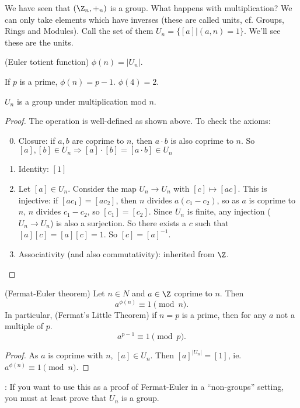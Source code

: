 \documentclass[a4paper]{article}
\begin{document}
  We have seen that $(\Z_n, +_n)$ is a group. What happens with multiplication? We can only take elements which have inverses (these are called units, cf. Groups, Rings and Modules). Call the set of them $U_n = \{[a] | (a, n) = 1\}$. We'll see these are the units.
  \begin{defi}
    (Euler totient function) $\phi (n) = |U_n|$.
  \end{defi}

  \begin{eg}
    If $p$ is a prime, $\phi(n) = p - 1$. $\phi(4) = 2$.
  \end{eg}

  \begin{prop}
    $U_n$ is a group under multiplication mod $n$.
  \end{prop}

  \begin{proof}
    The operation is well-defined as shown above. To check the axioms:
    \begin{enumerate}[label=\arabic{*}.]
        \setcounter{enumi}{-1}
      \item Closure: if $a, b$ are coprime to $n$, then $a\cdot b$ is also coprime to $n$. So $[a], [b]\in U_n \Rightarrow [a]\cdot [b] = [a\cdot b]\in U_n$
      \item Identity: $[1]$
      \item Let $[a]\in U_n$. Consider the map $U_n \to U_n$ with $[c]\mapsto [ac]$. This is injective: if $[ac_1] = [ac_2]$, then $n $ divides $a(c_1 - c_2)$, so as $a$ is coprime to $n$, $n$ divides $c_1 - c_2$, so $[c_1] = [c_2]$. Since $U_n$ is finite, any injection ($U_n \to U_n$) is also a surjection. So there exists a $c$ such that $[a][c] = [a][c] = 1$. So $[c] = [a]^{-1}$.
      \item Associativity (and also commutativity): inherited from $\Z$.
    \end{enumerate}
  \end{proof}
  \begin{thm}
    (Fermat-Euler theorem) Let $n\in N$ and $a\in \Z$ coprime to $n$. Then
    \[
      a^{\phi(n)} \equiv 1\pmod n.
    \]
    In particular, (Fermat's Little Theorem) if $n = p$ is a prime, then for any $a$ not a multiple of $p$.
    \[
      a^{p - 1}\equiv 1\pmod p.
    \]
  \end{thm}

  \begin{proof}
    As $a$ is coprime with $n$, $[a]\in U_n$. Then $[a]^{|U_n|} = [1]$, ie. $a^{\phi(n)} \equiv 1\pmod n$.
  \end{proof}
  \note: If you want to use this as a proof of Fermat-Euler in a ``non-groups'' setting, you must at least prove that $U_n$ is a group.
\end{document}
